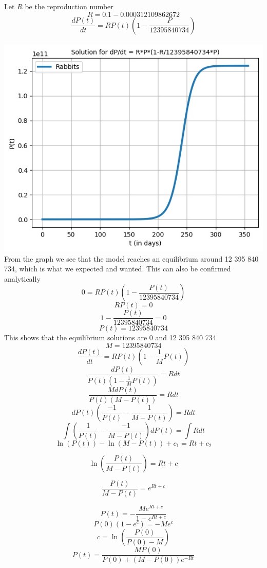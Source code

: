 \documentclass{article}
\begin{document}
Let $R$ be the reproduction number
$$
R = 0.1 - 0.000312109862672
$$
$$
\frac{dP(t)}{dt} = RP(t)(1-\frac{P}{12 395 840 734})
$$
\\
\includegraphics[scale=0.78]{Pictures/logis}
\\

From the graph we see that the model reaches an equilibrium around 12 395 840 734, which is what we expected and wanted. This can also be confirmed analytically 
$$
0= RP(t)(1-\frac{P(t)}{12 395 840 734})
$$
$$
RP(t) = 0
$$
$$
1-\frac{P(t)}{12 395 840 734} = 0
$$
$$
P(t) = 12 395 840 734
$$
This shows that the equilibrium solutions are 0 and 12 395 840 734
$$
M = 12 395 840 734 
$$
$$
\frac{dP(t)}{dt} = RP(t)(1 - \frac{1}{M}P(t))
$$
$$
\frac{dP(t)}{P(t)(1 - \frac{1}{M}P(t))} = Rdt
$$
$$
\frac{MdP(t)}{P(t)(M - P(t))} = Rdt
$$
$$
dP(t)(\frac{-1}{P(t)} - \frac{1}{M -P(t)})   = Rdt
$$
$$
\int{(\frac{1}{P(t)} - \frac{-1}{M -P(t)})dP(t) }  =\int{ R}dt
$$
$$
\ln(P(t)) - \ln(M -P(t)) + c_1 = Rt +c_2
$$

$$
 \ln(\frac{P(t)}{M -P(t)})  = Rt +c
$$

$$
\frac{P(t)}{M -P(t)}= e^{Rt +c}
$$

$$
P(t) = - \frac{Me^{Rt +c}}{1 - e^{Rt +c}}
$$
$$
P(0)(1 - e^{c}) = -Me^{c}
$$
$$
c = \ln(\frac{P(0)}{P(0)-M})
$$
$$
P(t) =  \frac{MP(0)}{P(0)+(M - P(0))e^{-Rt}}
$$
\end{document}
